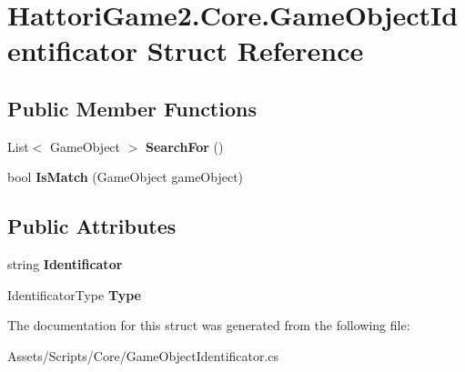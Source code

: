 \hypertarget{struct_hattori_game2_1_1_core_1_1_game_object_identificator}{}\section{Hattori\+Game2.\+Core.\+Game\+Object\+Identificator Struct Reference}
\label{struct_hattori_game2_1_1_core_1_1_game_object_identificator}
\subsection*{Public Member Functions}
\begin{DoxyCompactItemize}
\item 
\hypertarget{struct_hattori_game2_1_1_core_1_1_game_object_identificator_a418c958e88141611030934ec529239ef}{}List$<$ Game\+Object $>$ {\bfseries Search\+For} ()\label{struct_hattori_game2_1_1_core_1_1_game_object_identificator_a418c958e88141611030934ec529239ef}

\item 
\hypertarget{struct_hattori_game2_1_1_core_1_1_game_object_identificator_a83c0dd2fe2b4115c399b19ec1b02d66d}{}bool {\bfseries Is\+Match} (Game\+Object game\+Object)\label{struct_hattori_game2_1_1_core_1_1_game_object_identificator_a83c0dd2fe2b4115c399b19ec1b02d66d}

\end{DoxyCompactItemize}
\subsection*{Public Attributes}
\begin{DoxyCompactItemize}
\item 
\hypertarget{struct_hattori_game2_1_1_core_1_1_game_object_identificator_a9edc3e7e833038c8dad0c6dc4da3bed0}{}string {\bfseries Identificator}\label{struct_hattori_game2_1_1_core_1_1_game_object_identificator_a9edc3e7e833038c8dad0c6dc4da3bed0}

\item 
\hypertarget{struct_hattori_game2_1_1_core_1_1_game_object_identificator_abed6cf1fa2f801e6fb95b90c5d03c446}{}Identificator\+Type {\bfseries Type}\label{struct_hattori_game2_1_1_core_1_1_game_object_identificator_abed6cf1fa2f801e6fb95b90c5d03c446}

\end{DoxyCompactItemize}


The documentation for this struct was generated from the following file\+:\begin{DoxyCompactItemize}
\item 
Assets/\+Scripts/\+Core/Game\+Object\+Identificator.\+cs\end{DoxyCompactItemize}
